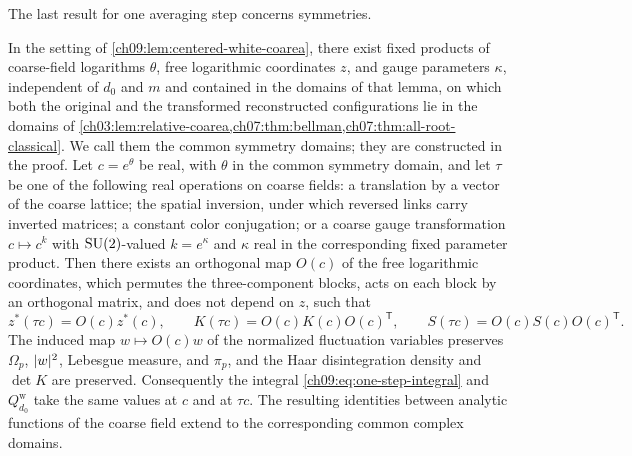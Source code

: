 The last result for one averaging step concerns symmetries.

\begin{proposition}\label{ch09:prop:one-step-symmetries}
In the setting of \cref{ch09:lem:centered-white-coarea}, there exist fixed products of coarse-field logarithms $\theta$, free logarithmic coordinates $z$, and gauge parameters $\kappa$, independent of $d_0$ and $m$ and contained in the domains of that lemma, on which both the original and the transformed reconstructed configurations lie in the domains of \cref{ch03:lem:relative-coarea,ch07:thm:bellman,ch07:thm:all-root-classical}. We call them the common symmetry domains; they are constructed in the proof. Let $c=e^\theta$ be real, with $\theta$ in the common symmetry domain, and let $\tau$ be one of the following real operations on coarse fields: a translation by a vector of the coarse lattice; the spatial inversion, under which reversed links carry inverted matrices; a constant color conjugation; or a coarse gauge transformation $c\mapsto c^k$ with $\mathrm{SU}(2)$-valued $k=e^\kappa$ and $\kappa$ real in the corresponding fixed parameter product. Then there exists an orthogonal map $O(c)$ of the free logarithmic coordinates, which permutes the three-component blocks, acts on each block by an orthogonal matrix, and does not depend on $z$, such that
\[
 z^*(\tau c)=O(c)z^*(c),\qquad K(\tau c)=O(c)K(c)O(c)^{\mathsf T},\qquad S(\tau c)=O(c)S(c)O(c)^{\mathsf T}.
\]
The induced map $w\mapsto O(c)w$ of the normalized fluctuation variables preserves $\Omega_p$, $\lvert w\rvert^2$, Lebesgue measure, and $\pi_p$, and the Haar disintegration density and $\det K$ are preserved. Consequently the integral \eqref{ch09:eq:one-step-integral} and $Q_{d_0}^{\mathrm w}$ take the same values at $c$ and at $\tau c$. The resulting identities between analytic functions of the coarse field extend to the corresponding common complex domains.
\end{proposition}

